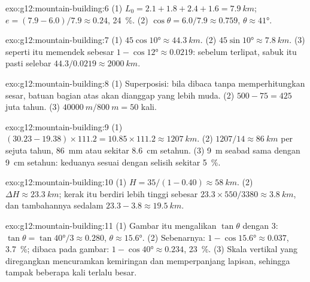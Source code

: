 \begin{solution}{exo:g12:mountain-building:6}
(1) $L_0 = 2.1 + 1.8 + 2.4 + 1.6 = \qty{7.9}{km}$;
$e = (7.9 - 6.0)/7.9 \approx 0.24$, \qty{24}{\percent}. (2) $\cos\theta =
6.0/7.9 \approx 0.759$, $\theta \approx \ang{41}$.
\end{solution}

\begin{solution}{exo:g12:mountain-building:7}
(1) $45\cos\ang{10} \approx \qty{44.3}{km}$. (2) $45\sin\ang{10} \approx
\qty{7.8}{km}$. (3)  seperti itu memendek sebesar $1 - \cos\ang{12} \approx 0.0219$:
sebelum terlipat, sabuk itu pasti selebar $44.3/0.0219 \approx \qty{2000}{km}$.
\end{solution}

\begin{solution}{exo:g12:mountain-building:8}
(1) Superposisi: bila dibaca tanpa memperhitungkan sesar, batuan bagian atas
akan dianggap yang lebih muda. (2) $500 - 75 = 425$ juta tahun. (3) $\qty{40000}{m} /
\qty{800}{m} = 50$ kali.
\end{solution}

\begin{solution}{exo:g12:mountain-building:9}
(1) $(30.23 - 19.38) \times 111.2 = 10.85 \times 111.2 \approx
\qty{1207}{km}$. (2) $1207/14 \approx \qty{86}{km}$ per sejuta tahun,
\qty{86}{mm} atau sekitar \qty{8.6}{cm} setahun. (3) \qty{9}{m} seabad sama
dengan \qty{9}{cm} setahun: keduanya sesuai dengan selisih sekitar
\qty{5}{\percent}.
\end{solution}

\begin{solution}{exo:g12:mountain-building:10}
(1) $H = 35/(1 - 0.40) \approx \qty{58}{km}$. (2) $\Delta H \approx
\qty{23.3}{km}$; kerak itu berdiri lebih tinggi sebesar $23.3 \times 550/3380 \approx
\qty{3.8}{km}$, dan  tambahannya sedalam $23.3 - 3.8 \approx \qty{19.5}{km}$.
\end{solution}

\begin{solution}{exo:g12:mountain-building:11}
(1) Gambar itu mengalikan $\tan\theta$ dengan 3: $\tan\theta = \tan\ang{40}/3
\approx 0.280$, $\theta \approx \ang{15.6}$. (2) Sebenarnya: $1 - \cos\ang{15.6}
\approx 0.037$, \qty{3.7}{\percent}; dibaca pada gambar: $1 - \cos\ang{40}
\approx 0.234$, \qty{23}{\percent}. (3) Skala vertikal yang diregangkan
mencuramkan kemiringan dan memperpanjang lapisan, sehingga  tampak
beberapa kali terlalu besar.
\end{solution}

